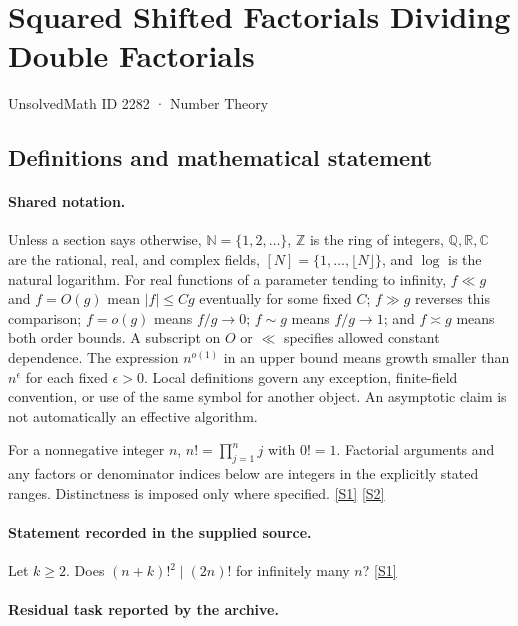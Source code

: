 \documentclass[11pt,a4paper]{article}
\newcommand{\N}{\mathbb{N}}
\newcommand{\Z}{\mathbb{Z}}
\newcommand{\Q}{\mathbb{Q}}
\newcommand{\R}{\mathbb{R}}
\newcommand{\C}{\mathbb{C}}
\newcommand{\sref}[2]{\hyperlink{source:#1:#2}{[S#2]}}
\begin{document}

\setcounter{section}{2281}

\section{Squared Shifted Factorials Dividing Double Factorials}\label{2282}

{\small\sffamily UnsolvedMath ID 2282 · Number Theory}

\subsection{Definitions and mathematical statement}

\paragraph{Shared notation.}Unless a section says otherwise, $\N=\{1,2,\ldots\}$,
$\Z$ is the ring of integers, $\Q,\R,\C$ are the rational, real, and complex
fields, $[N]=\{1,\ldots,\lfloor N\rfloor\}$, and $\log$ is the natural
logarithm. For real functions of a parameter tending to infinity,
$f\ll g$ and $f=O(g)$ mean $|f|\leq Cg$ eventually for some fixed $C$;
$f\gg g$ reverses this comparison; $f=o(g)$ means $f/g\to0$;
$f\sim g$ means $f/g\to1$; and $f\asymp g$ means both order bounds.
A subscript on $O$ or $\ll$ specifies allowed constant dependence.
The expression $n^{o(1)}$ in an upper bound means growth smaller than
$n^\epsilon$ for each fixed $\epsilon>0$. Local definitions govern any
exception, finite-field convention, or use of the same symbol for another
object. An asymptotic claim is not automatically an effective algorithm.



For a nonnegative integer $n$, $n!=\prod_{j=1}^n j$ with $0!=1$. Factorial arguments and any factors or denominator indices below are integers in the explicitly stated ranges. Distinctness is imposed only where specified. \sref{2282}{1} \sref{2282}{2}

\paragraph{Statement recorded in the supplied source.}
Let $k\geq 2$. Does $ (n+k)!^2 \mid (2n)! $ for infinitely many $n$? \sref{2282}{1}

\paragraph{Residual task reported by the archive.}
\end{document}
